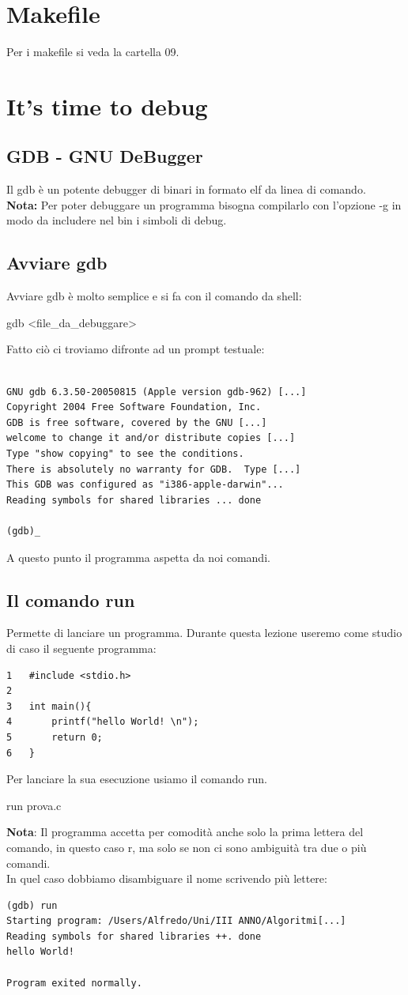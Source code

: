 \documentclass[a4paper,12pt]{article} %
\begin{document}
\section{Makefile}
Per i makefile si veda la cartella 09.
\section{It's time to debug}
\subsection{GDB - GNU DeBugger}
Il gdb è un potente debugger di binari in formato elf da linea di comando.\\
\textbf{Nota:} Per poter debuggare un programma bisogna compilarlo con l'opzione -g in modo da includere nel bin i simboli di debug.
\subsection{Avviare gdb}
Avviare gdb è molto semplice e si fa con il comando da shell:\\
\begin{center}
gdb <file\_da\_debuggare>
\end{center}
Fatto ciò ci troviamo difronte ad un prompt testuale:
\begin{lstlisting}

GNU gdb 6.3.50-20050815 (Apple version gdb-962) [...]
Copyright 2004 Free Software Foundation, Inc.
GDB is free software, covered by the GNU [...]
welcome to change it and/or distribute copies [...]
Type "show copying" to see the conditions.
There is absolutely no warranty for GDB.  Type [...]
This GDB was configured as "i386-apple-darwin"...
Reading symbols for shared libraries ... done

(gdb)_
\end{lstlisting}
A questo punto il programma aspetta da noi comandi.
\subsection{Il comando run}
Permette di lanciare un programma. Durante questa lezione useremo come studio di caso il seguente programma:
\begin{lstlisting}
1	#include <stdio.h>
2	
3	int main(){
4	    printf("hello World! \n");
5	    return 0;
6	}
\end{lstlisting}
Per lanciare la sua esecuzione usiamo il comando run.
\begin{center}
run prova.c
\end{center}
\textbf{Nota}: Il programma accetta per comodità anche solo la prima lettera del comando, in questo caso r, ma solo se non ci sono ambiguità tra due o più comandi.\\
In quel caso dobbiamo disambiguare il nome scrivendo più lettere:
\begin{lstlisting}
(gdb) run
Starting program: /Users/Alfredo/Uni/III ANNO/Algoritmi[...]
Reading symbols for shared libraries ++. done
hello World! 

Program exited normally.
\end{lstlisting}
\end{document}
